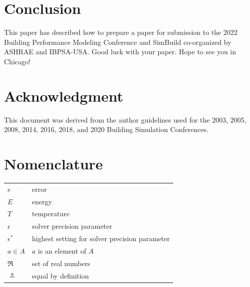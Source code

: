 \documentclass[twocolumn, 10pt, times, letterpaper]{article}
\begin{document}
\section{Conclusion}
This paper has described how to prepare a paper for submission to the 2022 Building Performance Modeling Conference and SimBuild co-organized by ASHRAE and IBPSA-USA. Good luck with your paper. Hope to see you in Chicago!

\section{Acknowledgment}
This document was derived from the author guidelines used for the 2003, 2005, 2008, 2014, 2016, 2018, and 2020 Building Simulation Conferences.


\section{Nomenclature}

\begin{tabular}{p{12mm}p{55mm}}
  $e$        & error \\
  $E$        & energy \\
  $T$        & temperature \\
  $\epsilon$ & solver precision parameter \\
  $\epsilon^*$ & highest setting for solver precision parameter \\
  $a \in A$      & $a$ is an element of $A$\\
  $\Re$      & set of real numbers \\
  $\triangleq$ & equal by definition \\
\end{tabular}

 



\end{document}
